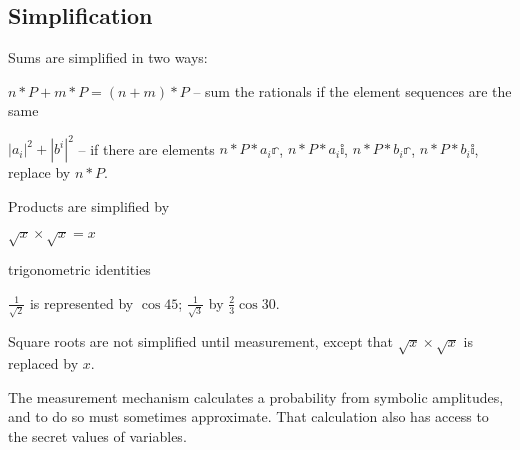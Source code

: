 \subsection{Simplification}

Sums are simplified in two ways:
\begin{itemize*}
\item $n*P+m*P=(n+m)*P$ -- sum the rationals if the element sequences are the same
\item $|a_{i}|^{2}+|b^{i}|^{2}$ -- if there are elements $n*P*a_{i}\mathbb{r}$, $n*P*a_{i}\mathbb{i}$, $n*P*b_{i}\mathbb{r}$, $n*P*b_{i}\mathbb{i}$, replace by $n*P$.
\end{itemize*}

Products are simplified by
\begin{itemize*}
\item $\sqrt{x}\times\sqrt{x}=x$
\item trigonometric identities
\end{itemize*}
 
$\frac{1}{\sqrt2}$ is represented by $\cos{45}$; $\frac{1}{\sqrt3}$ by $\frac{2}{3}\cos{30}$.

Square roots are not simplified until measurement, except that $\sqrt{x}\times\sqrt{x}$ is replaced by $x$. 



The measurement mechanism calculates a probability from symbolic amplitudes, and to do so must sometimes approximate. That calculation also has access to the secret values of variables.